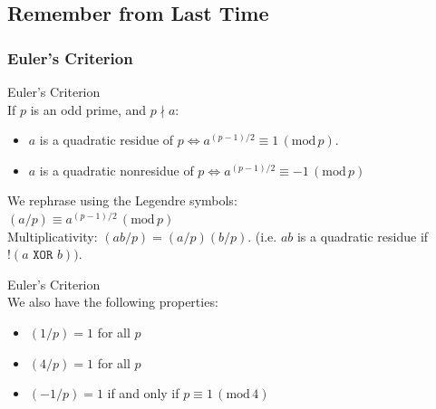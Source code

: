 \documentclass[10pt,oneside]{book}
\newcommand{\gspc}{\vspace{0.13cm}} %
\newcommand{\gline}{\gspc\\} %
\newcommand{\gmod}[1]{\,(\text{mod}\,#1)}
\begin{document}
\newcommand{\cg}[1]{\color{OliveGreen}#1\color{white}}
\newcommand{\cb}[1]{\color{BlueViolet}#1\color{white}}

\subsection*{Remember from Last Time}
\subsubsection*{Euler's Criterion}
\begin{criterion}{Euler's Criterion}{}\gline
  If $p$ is an odd prime, and $p\nmid a$:
  \begin{itemize}[itemsep=0pt, parsep=0pt]
    \item $a$ is a quadratic residue of $p \Leftrightarrow a^{(p-1)/2}\equiv 1\gmod{p}$.
    \item $a$ is a quadratic nonresidue of $p\Leftrightarrow a^{(p-1)/2}\equiv -1 \gmod p$
  \end{itemize}
\end{criterion}
We rephrase using the Legendre symbols: \gline
$(a/p)\equiv a^{(p-1)/2}\gmod p$\\
Multiplicativity: $(ab/p) = (a/p)(b/p)$. (i.e. $ab$ is a quadratic residue if $!(a \texttt{ XOR } b))$.
\begin{corollary}{Euler's Criterion}{}\gline
  We also have the following properties:
  \begin{itemize}[itemsep=0pt, parsep=0pt]
    \item $(1/p) = 1$ for all $p$
    \item $(4/p) = 1$ for all $p$
    \item $(-1/p) = 1$ if and only if $p\equiv 1 \gmod 4$
  \end{itemize}
\end{corollary}
\end{document}

